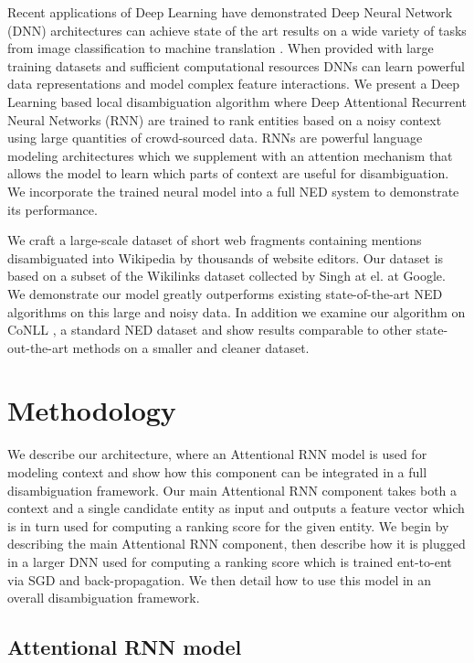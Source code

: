 \documentclass[11pt]{article}
\begin{document}
Recent applications of Deep Learning have demonstrated Deep Neural Network (DNN) architectures can achieve state of the art results on a wide variety of tasks from image classification \cite{krizhevsky2012imagenet} to machine translation \cite{bahdanau2014neural}. When provided with large training datasets and sufficient computational resources DNNs can learn powerful data representations and model complex feature interactions. We present a Deep Learning based local disambiguation algorithm where Deep Attentional Recurrent Neural Networks (RNN) are trained to rank entities based on a noisy context using large quantities of crowd-sourced data. RNNs are powerful language modeling architectures which we supplement with an attention mechanism that allows the model to learn which parts of context are useful for disambiguation. We incorporate the trained neural model into a full NED system to demonstrate its performance.

We craft a large-scale dataset of short web fragments containing mentions disambiguated into Wikipedia by thousands of website editors. Our dataset is based on a subset of the Wikilinks dataset \cite{singh12:wiki-links} collected by Singh at el. at Google. We demonstrate our model greatly outperforms existing state-of-the-art NED algorithms on this large and noisy data. In addition we examine our algorithm on CoNLL \cite{hoffart2011robust}, a standard NED dataset and show results comparable to other state-out-the-art methods on a smaller and cleaner dataset.

\section{Methodology}

We describe our architecture, where an Attentional RNN model is used for modeling context and show how this component can be integrated in a full disambiguation framework. Our main Attentional RNN component takes both a context and a single candidate entity as input and outputs a feature vector which is in turn used for computing a ranking score for the given entity. We begin by describing the main Attentional RNN component, then describe how it is plugged in a larger DNN used for computing a ranking score which is trained ent-to-ent via SGD and back-propagation. We then detail how to use this model in an overall disambiguation framework.

\subsection{Attentional RNN model}
\end{document}
